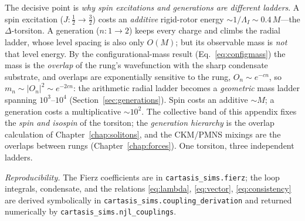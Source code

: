\noindent The decisive point is \emph{why spin excitations and generations are different ladders}. A
spin excitation ($J:\tfrac12\!\to\!\tfrac32$) costs an \emph{additive} rigid-rotor energy
$\sim1/\Lambda_I\sim0.4\,M$---the $\Delta$-torsiton. A generation ($n:1\!\to\!2$) keeps every charge
and climbs the radial ladder, whose level spacing is also only $O(M)$; but its observable mass is
\emph{not} that level energy. By the configurational-mass result (Eq.~\ref{eq:configmass}) the mass is
the \emph{overlap} of the rung's wavefunction with the sharp condensate substrate, and overlaps are
exponentially sensitive to the rung, $O_n\sim e^{-cn}$, so $m_n\sim|O_n|^2\sim e^{-2cn}$: the
arithmetic radial ladder becomes a \emph{geometric} mass ladder spanning $10^{3}$--$10^{4}$
(Section~\ref{sec:generations}). Spin costs an additive $\sim M$; a generation costs a multiplicative
$\sim10^{2}$. The collective band of this appendix fixes the \emph{spin and isospin} of the torsiton;
the \emph{generation hierarchy} is the overlap calculation of Chapter~\ref{chap:solitons}, and the
CKM/PMNS mixings are the overlaps between rungs (Chapter~\ref{chap:forces}). One torsiton, three
independent ladders.

\bigskip
\noindent\emph{Reproducibility.} The Fierz coefficients are in \texttt{cartasis\_sims.fierz}; the
loop integrals, condensate, and the relations \eqref{eq:lambda}, \eqref{eq:vector},
\eqref{eq:consistency} are derived symbolically in \texttt{cartasis\_sims.coupling\_derivation}
and returned numerically by \texttt{cartasis\_sims.njl\_couplings}.

